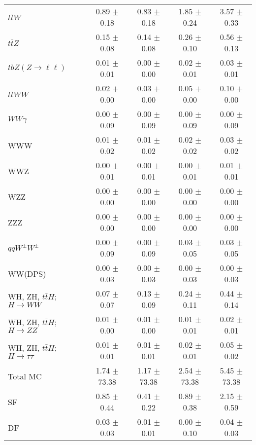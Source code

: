 \begin{tabular}{l|cccc}
                   $t\overline{t}W$ &  0.89 $\pm$  0.18 &  0.83 $\pm$  0.18 &  1.85 $\pm$  0.24 &  3.57 $\pm$  0.33 \\
                   $t\overline{t}Z$ &  0.15 $\pm$  0.08 &  0.14 $\pm$  0.08 &  0.26 $\pm$  0.10 &  0.56 $\pm$  0.13 \\
    $tbZ (Z \rightarrow \ell \ell)$ &  0.01 $\pm$  0.01 &  0.00 $\pm$  0.00 &  0.02 $\pm$  0.01 &  0.03 $\pm$  0.01 \\
                  $t\overline{t}WW$ &  0.02 $\pm$  0.00 &  0.03 $\pm$  0.00 &  0.05 $\pm$  0.00 &  0.10 $\pm$  0.00 \\
                         $WW\gamma$ &  0.00 $\pm$  0.09 &  0.00 $\pm$  0.09 &  0.00 $\pm$  0.09 &  0.00 $\pm$  0.09 \\
                                WWW &  0.01 $\pm$  0.02 &  0.01 $\pm$  0.02 &  0.02 $\pm$  0.02 &  0.03 $\pm$  0.02 \\
                                WWZ &  0.00 $\pm$  0.01 &  0.00 $\pm$  0.01 &  0.00 $\pm$  0.01 &  0.01 $\pm$  0.01 \\
                                WZZ &  0.00 $\pm$  0.00 &  0.00 $\pm$  0.00 &  0.00 $\pm$  0.00 &  0.00 $\pm$  0.00 \\
                                ZZZ &  0.00 $\pm$  0.00 &  0.00 $\pm$  0.00 &  0.00 $\pm$  0.00 &  0.00 $\pm$  0.00 \\
                 $qqW^{\pm}W^{\pm}$ &  0.00 $\pm$  0.09 &  0.00 $\pm$  0.09 &  0.03 $\pm$  0.05 &  0.03 $\pm$  0.05 \\
                            WW(DPS) &  0.00 $\pm$  0.03 &  0.00 $\pm$  0.03 &  0.00 $\pm$  0.03 &  0.00 $\pm$  0.03 \\
WH, ZH, $t\bar{t}H$; $H \rightarrow WW$ &  0.07 $\pm$  0.07 &  0.13 $\pm$  0.09 &  0.24 $\pm$  0.11 &  0.44 $\pm$  0.14 \\
WH, ZH, $t\bar{t}H$; $H \rightarrow ZZ$ &  0.01 $\pm$  0.00 &  0.01 $\pm$  0.00 &  0.01 $\pm$  0.01 &  0.02 $\pm$  0.01 \\
WH, ZH, $t\bar{t}H$; $H \rightarrow \tau\tau$ &  0.01 $\pm$  0.01 &  0.01 $\pm$  0.01 &  0.02 $\pm$  0.01 &  0.05 $\pm$  0.02 \\
\hline\hline
                           Total MC &  1.74 $\pm$ 73.38 &  1.17 $\pm$ 73.38 &  2.54 $\pm$ 73.38 &  5.45 $\pm$ 73.38 \\
\hline
                                 SF &  0.85 $\pm$  0.44 &  0.41 $\pm$  0.22 &  0.89 $\pm$  0.38 &  2.15 $\pm$  0.59 \\
                                 DF &  0.03 $\pm$  0.03 &  0.01 $\pm$  0.01 &  0.00 $\pm$  0.10 &  0.04 $\pm$  0.03 \\

\end{tabular}
